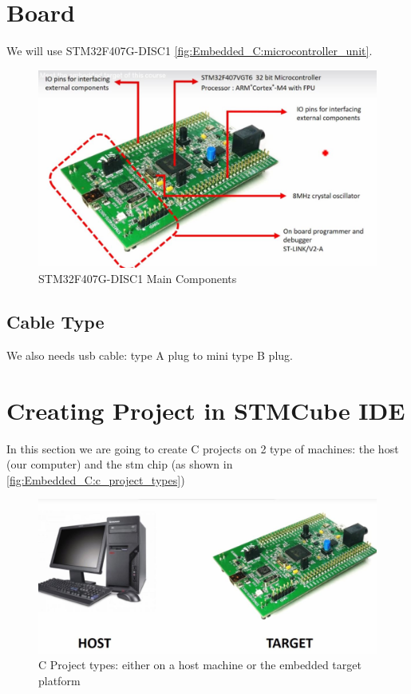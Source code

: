 \newpage
\section{Board}

We will use STM32F407G-DISC1 \autoref{fig:Embedded_C:microcontroller_unit}.

\begin{figure}[h]
\centering
\includegraphics[scale=0.5]{Figures/Embedded_C/microcontroller_unit}
\caption{STM32F407G-DISC1 Main Components}
\label{fig:Embedded_C:microcontroller_unit}
\end{figure}


\subsection{Cable Type}

We also needs usb cable: type A plug to mini type B plug.

\newpage
\section{Creating Project in STMCube IDE}
\label{Sec:creating_project}

In this section we are going to create C projects on 2 type of machines: the host (our computer) and the stm chip (as shown in \autoref{fig:Embedded_C:c_project_types})

\begin{figure}[h]
\centering
\includegraphics[scale=0.3]{Figures/Embedded_C/c_project_types}
\caption{C Project types: either on a host machine or the embedded target platform}
\label{fig:Embedded_C:c_project_types}
\end{figure}

